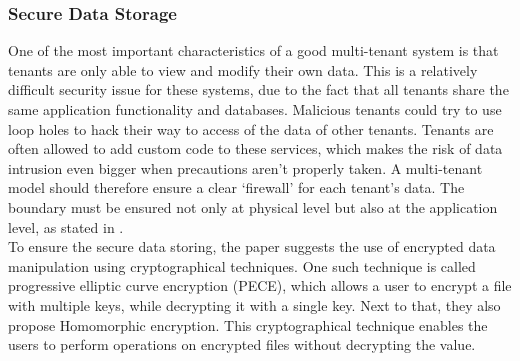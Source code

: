 \subsubsection{Secure Data Storage}
One of the most important characteristics of a good multi-tenant system is that tenants are only able to view and modify their own data. This is a relatively difficult security issue for these systems, due to the fact that all tenants share the same application functionality and databases. Malicious tenants could try to use loop holes to hack their way to access of the data of other tenants. Tenants are often allowed to add custom code to these services, which makes the risk of data intrusion even bigger when precautions aren’t properly taken. A multi-tenant model should therefore ensure a clear ‘firewall’ for each tenant’s data. The boundary must be ensured not only at physical level but also at the application level, as stated in \cite{Subashini2010Security}. \\
To ensure the secure data storing, the paper \cite{Takahashi2012Security} suggests the use of encrypted data manipulation using cryptographical techniques. One such technique is called progressive elliptic curve encryption (PECE), which allows a user to encrypt a file with multiple keys, while decrypting it with a single key. Next to that, they also propose Homomorphic encryption. This cryptographical technique enables the users to perform operations on encrypted files without decrypting the value.\\

